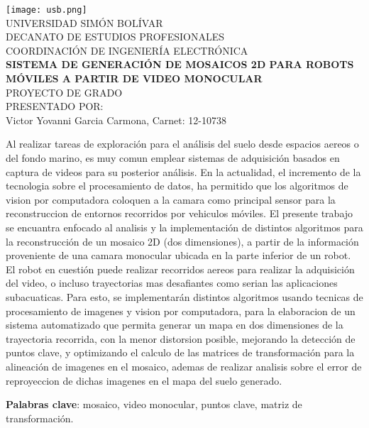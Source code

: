 \begin{titlepage}
    \begin{center}

        \texttt{[image: usb.png]} \\
        \textsc {\large UNIVERSIDAD SIMÓN BOLÍVAR} \\
        \textsc{DECANATO DE ESTUDIOS PROFESIONALES\\
        COORDINACIÓN DE INGENIERÍA ELECTRÓNICA}\\
        \textbf{SISTEMA DE GENERACIÓN DE MOSAICOS 2D PARA ROBOTS MÓVILES A PARTIR DE VIDEO MONOCULAR} \\
        PROYECTO DE GRADO \\
        PRESENTADO POR: \\
        Victor Yovanni Garcia Carmona, Carnet: 12-10738

    \end{center}
\abstract
{
    Al realizar tareas de exploración para el análisis del suelo desde espacios aereos o del fondo marino, es muy comun emplear sistemas de adquisición basados en captura de videos para su posterior análisis. En la actualidad, el incremento de la tecnologia sobre el procesamiento de datos, ha permitido que los algoritmos de vision por computadora coloquen a la camara como principal sensor para la reconstruccion de entornos recorridos por vehiculos móviles. El presente trabajo se encuantra enfocado al analisis y la implementación de distintos algoritmos para la reconstrucción de un mosaico 2D (dos dimensiones), a partir de la información proveniente de una camara monocular ubicada en la parte inferior de un robot. El robot en cuestión puede realizar recorridos aereos para realizar la adquisición del video, o incluso trayectorias mas desafiantes como serian las aplicaciones subacuaticas. Para esto, se implementarán distintos algoritmos usando tecnicas de procesamiento de imagenes y vision por computadora, para la elaboracion de un sistema automatizado que permita generar un mapa en dos dimensiones de la trayectoria recorrida, con la menor distorsion posible, mejorando la detección de puntos clave, y optimizando el calculo de las matrices de transformación para la alineación de imagenes en el mosaico, ademas de realizar analisis sobre el error de reproyeccion de dichas imagenes en el mapa del suelo generado.
    
}

\noindent \begin{small} \textbf{Palabras clave}: mosaico, video monocular, puntos clave, matriz de transformación. 
\end{small}
	
\clearpage
{}

\end{titlepage}
